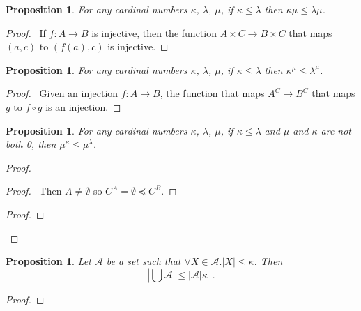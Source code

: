 \documentclass{book}
\let\qed\relax
\newtheorem{prop}[ax]{Proposition}
\theoremstyle{definition}
\begin{document}
\begin{prop}
For any cardinal numbers $\kappa$, $\lambda$, $\mu$, if $\kappa \leq \lambda$ then $\kappa \mu \leq \lambda \mu$.
\end{prop}

\begin{proof}
\pf\ If $f : A \rightarrow B$ is injective, then the function $A \times C \rightarrow B \times C$ that maps $(a,c)$ to $(f(a),c)$ is injective. \qed
\end{proof}

\begin{prop}
For any cardinal numbers $\kappa$, $\lambda$, $\mu$, if $\kappa \leq \lambda$ then $\kappa^\mu \leq \lambda^\mu$.
\end{prop}

\begin{proof}
\pf\ Given an injection $f : A \rightarrow B$, the function that maps $A^C \rightarrow B^C$ that maps $g$ to $f \circ g$ is an injection. \qed
\end{proof}

\begin{prop}
For any cardinal numbers $\kappa$, $\lambda$, $\mu$, if $\kappa \leq \lambda$ and $\mu$ and $\kappa$ are not both 0, then $\mu^\kappa \leq \mu^\lambda$.
\end{prop}

\begin{proof}
\pf
{}
\begin{proof}
	\pf\ Then $A \neq \emptyset$ so $C^A = \emptyset \preccurlyeq C^B$.
\end{proof}
\begin{proof}
\end{proof}
\qed
\end{proof}

\begin{prop}
\label{prop:unioncard}
Let $\mathcal{A}$ be a set such that $\forall X \in \mathcal{A}. |X| \leq \kappa$. Then
\[ \left| \bigcup \mathcal{A} \right| \leq |\mathcal{A}| \kappa \enspace . \]
\end{prop}

\begin{proof}
\pf
{}
\qed
\end{proof}
\end{document}
